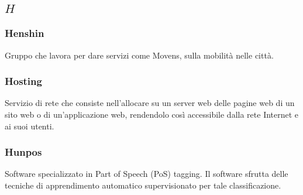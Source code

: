 \subsection*{\quad$H\quad$}

\subsubsection*{Henshin}
Gruppo che lavora per dare servizi come Movens\glo, sulla mobilità nelle città.

\subsubsection*{Hosting}
Servizio di rete che consiste nell'allocare su un server web delle pagine web di un sito web o di un'applicazione web, rendendolo così accessibile dalla rete Internet e ai suoi utenti.

\subsubsection*{Hunpos}
Software specializzato in Part of Speech (PoS) tagging\glo. Il software sfrutta delle tecniche di apprendimento automatico supervisionato per tale classificazione.  

